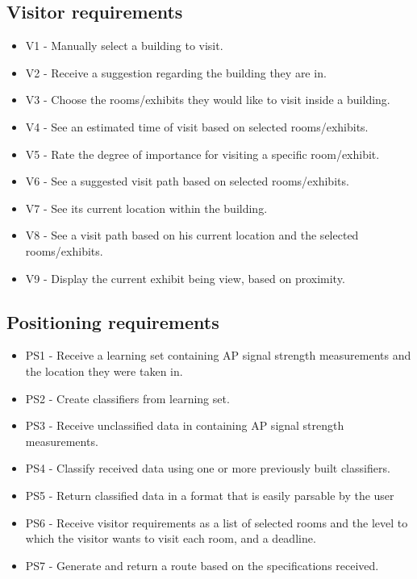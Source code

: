 \subsection{Visitor requirements}
	\begin{itemize}
		\item V1 - Manually select a building to visit.
		\item V2 - Receive a suggestion regarding the building they are in.
		\item V3 - Choose the rooms/exhibits they would like to visit inside a building.
		\item V4 - See an estimated time of visit based on selected rooms/exhibits.
		\item V5 - Rate the degree of importance for visiting a specific room/exhibit.
		\item V6 - See a suggested visit path based on selected rooms/exhibits.
		\item V7 - See its current location within the building.
		\item V8 - See a visit path based on his current location and the selected rooms/exhibits.
		\item V9 - Display the current exhibit being view, based on proximity.
	\end{itemize}

\subsection{Positioning requirements}
	\begin{itemize}
		\item PS1 - Receive a learning set containing AP signal strength measurements and the 	location they were taken in.
		\item PS2 - Create classifiers from learning set.
		\item PS3 - Receive unclassified data in containing AP signal strength measurements.
		\item PS4 - Classify received data using one or more previously built classifiers.
		\item PS5 - Return classified data in a format that is easily parsable by the user
		\item PS6 - Receive visitor requirements as a list of selected rooms and the level to which the visitor wants to visit each room, and a deadline.
		\item PS7 - Generate and return a route based on the specifications received.
	\end{itemize}

